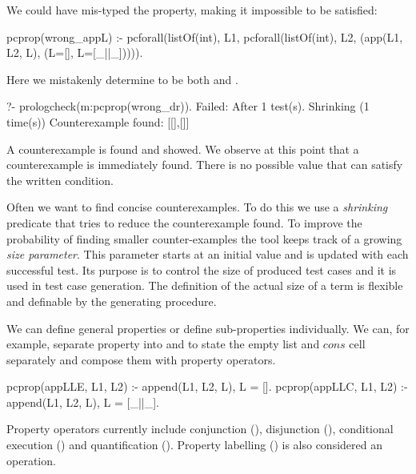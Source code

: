 We could have mis-typed the property, making it impossible to be satisfied:
%
\begin{yapcode}
 pcprop(wrong_appL) :- pcforall(listOf(int), L1,
   pcforall(listOf(int), L2, (app(L1, L2, L), (L=[], L=[_||_])))).
\end{yapcode}
%
Here we mistakenly determine  to be both  \yap{[]} and  \yap{[_||_]}.
%
\begin{yapcode}
   ?- prologcheck(m:pcprop(wrong_dr)).
 Failed: After 1 test(s).
 Shrinking (1 time(s))
 Counterexample found: [[],[]]
\end{yapcode}
A counterexample is found and showed.
%
We observe at this point that a counterexample is immediately found.
%
There is no possible value that can satisfy the written condition.
%


Often we want to find concise counterexamples.
%
To do this we use a \emph{shrinking} predicate that tries to reduce the
counterexample found.
%
To improve the probability of finding smaller counter-examples the tool
keeps track of a growing \emph{size parameter}.
%
This parameter  starts at an initial value and is updated with each
successful test.
%
Its purpose is to control the size of produced test cases and it is used
in test case generation.
%
The definition of the actual size of a term is flexible and definable by
the generating procedure. 


We can define general properties or define sub-properties individually. 
%
We can, for example, separate property  into
 and  to state the empty list and $cons$
cell separately and compose them with property operators.
%
\begin{yapcode}
 pcprop({appLLE, L1, L2}) :- append(L1, L2, L), L = [].
 pcprop({appLLC, L1, L2}) :- append(L1, L2, L), L = [_||_].
\end{yapcode}


Property operators currently  include conjunction
 (), disjunction (), conditional
execution () and quantification
().
%
Property labelling () is also considered an operation.
%




